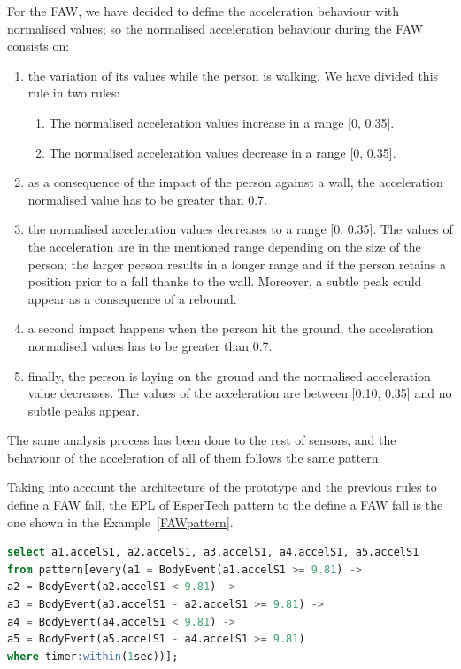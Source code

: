 \documentclass[review]{elsarticle}
\begin{document}
For the FAW, we have decided to define the acceleration behaviour with normalised values; so the 
normalised acceleration behaviour during the FAW consists on:
\begin{enumerate}
 \item the variation of its values while the person is walking. We have divided this rule in two rules:
 \begin{enumerate}
  \item The normalised acceleration values increase in a range [0, 0.35].
  \item The normalised acceleration values decrease in a range [0, 0.35].
 \end{enumerate}
 \item as a consequence of the impact of the person against a wall, the acceleration normalised value 
 has to be greater than 0.7.
 \item the normalised acceleration values decreases to a range [0, 0.35]. The values of the acceleration are 
 in the mentioned range depending on the size of the person; the larger person results in a longer range 
 and if the person retains a position prior to a fall thanks to the wall. Moreover, a subtle peak could 
 appear as a consequence of a rebound.
 \item a second impact happens when the person hit the ground, the acceleration normalised values has to 
 be greater than 0.7.
 \item finally, the person is laying on the ground and the normalised acceleration value decreases. The 
 values of the acceleration are between [0.10, 0.35] and no subtle peaks appear. 
\end{enumerate}

The same analysis process has been done to the rest of sensors, and the behaviour of the acceleration of all of 
them follows the same pattern.

Taking into account the architecture of the prototype and the previous rules to define a FAW fall, the EPL of EsperTech
pattern to the define a FAW fall is the one shown in the Example~\ref{FAWpattern}.

\begin{lstlisting}[basicstyle=\ttfamily\footnotesize,language=SQL, mathescape,caption=FAW pattern,label=FAWpattern]
select a1.accelS1, a2.accelS1, a3.accelS1, a4.accelS1, a5.accelS1 
from pattern[every(a1 = BodyEvent(a1.accelS1 >= 9.81) -> 
a2 = BodyEvent(a2.accelS1 < 9.81) ->
a3 = BodyEvent(a3.accelS1 - a2.accelS1 >= 9.81) ->
a4 = BodyEvent(a4.accelS1 < 9.81) ->
a5 = BodyEvent(a5.accelS1 - a4.accelS1 >= 9.81) 
where timer:within(1sec))];
\end{lstlisting}
\end{document}
